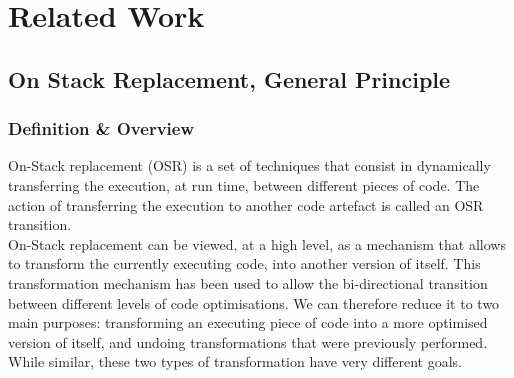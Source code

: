 
\chapter{Related Work} %

\label{Chapter2} %


\newcommand{\keyword}[1]{\textbf{#1}}
\newcommand{\tabhead}[1]{\textbf{#1}}
\newcommand{\code}[1]{\texttt{#1}}
\newcommand{\file}[1]{\texttt{\bfseries#1}}
\newcommand{\option}[1]{\texttt{\itshape#1}}


\section{On Stack Replacement, General Principle}

\subsection{Definition \& Overview}
On-Stack replacement (OSR) is a set of techniques that consist in dynamically transferring the execution, at run time, between different pieces of code.
The action of transferring the execution to another code artefact is called an OSR transition.\\

On-Stack replacement can be viewed, at a high level, as a mechanism that allows to transform the currently executing code, into another version of itself.
This transformation mechanism has been used to allow the bi-directional transition between different levels of code optimisations.
We can therefore reduce it to two main purposes: transforming an executing piece of code into a more optimised version of itself, and undoing transformations that were previously performed.
While similar, these two types of transformation have very different goals.\\

